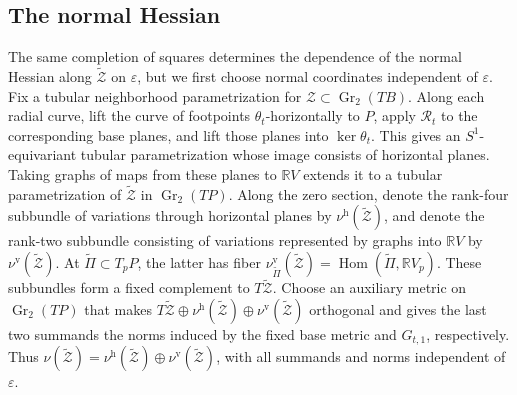 \documentclass[11pt]{article}
\theoremstyle{definition}
\theoremstyle{remark}
\newcommand{\R}{\mathbb R}
\newcommand{\cZ}{\mathcal Z}
\newcommand{\tZ}{\widetilde{\mathcal Z}}
\newcommand{\Gr}{\operatorname{Gr}}
\newcommand{\eps}{\varepsilon}
\begin{document}
\subsection{The normal Hessian}

The same completion of squares determines the dependence of the normal
Hessian along $\tZ$ on $\eps$, but we first choose normal coordinates
independent of $\eps$.
Fix a tubular neighborhood parametrization for
$\cZ\subset\Gr_2(TB)$.  Along each radial curve, lift the curve of
footpoints $\theta_t$-horizontally to $P$, apply $\mathcal R_t$ to the
corresponding base planes, and lift those planes into $\ker\theta_t$.  This
gives an $S^1$-equivariant tubular parametrization whose image consists of
horizontal planes.  Taking graphs of maps from these planes to $\R V$ extends
it to a tubular parametrization of $\tZ$ in $\Gr_2(TP)$.  Along the zero
section, denote the
rank-four subbundle of variations through horizontal planes by
$\nu^{\mathrm h}(\tZ)$, and denote the rank-two subbundle consisting of
variations represented by graphs into $\R V$ by $\nu^{\mathrm v}(\tZ)$.  At
$\widetilde\Pi\subset T_pP$, the latter has fiber
$\nu^{\mathrm v}_{\widetilde\Pi}(\tZ)
=\operatorname{Hom}(\widetilde\Pi,\R V_p)$.  These subbundles form a fixed
complement to $T\tZ$.  Choose an auxiliary metric on $\Gr_2(TP)$ that makes
$T\tZ\oplus\nu^{\mathrm h}(\tZ)\oplus\nu^{\mathrm v}(\tZ)$ orthogonal and
gives the last two summands the norms induced by the fixed base metric and
$G_{t,1}$, respectively.  Thus
$\nu(\tZ)=\nu^{\mathrm h}(\tZ)\oplus\nu^{\mathrm v}(\tZ)$, with all summands and
norms independent of $\eps$.
\end{document}
